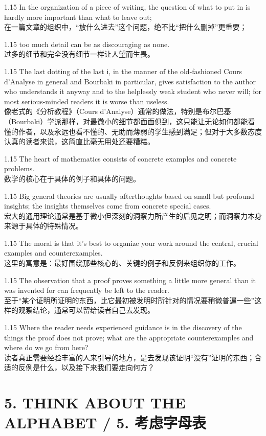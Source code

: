 \documentclass[12pt,a4paper]{article}
\newcommand{\bilingual}[2]{
    \begin{spacing}{1.15} %
        \noindent \normalsize #1 \\[-0.5ex] %
        \small \textcolor{blue!70!black}{#2} %
    \end{spacing}
    \vspace{0.8em} %
}
\begin{document}
\bilingual{In the organization of a piece of writing, the question of what to put in is hardly more important than what to leave out;}
{在一篇文章的组织中，“放什么进去”这个问题，绝不比“把什么删掉”更重要；} %

\bilingual{too much detail can be as discouraging as none.}
{过多的细节和完全没有细节一样让人望而生畏。} %

\bilingual{The last dotting of the last i, in the manner of the old-fashioned Cours d'Analyse in general and Bourbaki in particular, gives satisfaction to the author who understands it anyway and to the helplessly weak student who never will; for most serious-minded readers it is worse than useless.}
{像老式的《分析教程》（Cours d'Analyse）通常的做法，特别是布尔巴基（Bourbaki）学派那样，对最微小的细节都面面俱到，这只能让无论如何都能看懂的作者，以及永远也看不懂的、无助而薄弱的学生感到满足；但对于大多数态度认真的读者来说，这简直比毫无用处还要糟糕。} %

\bilingual{The heart of mathematics consists of concrete examples and concrete problems.}
{数学的核心在于具体的例子和具体的问题。} %

\bilingual{Big general theories are usually afterthoughts based on small but profound insights; the insights themselves come from concrete special cases.}
{宏大的通用理论通常是基于微小但深刻的洞察力所产生的后见之明；而洞察力本身来源于具体的特殊情况。} %

\bilingual{The moral is that it's best to organize your work around the central, crucial examples and counterexamples.}
{这里的寓意是：最好围绕那些核心的、关键的例子和反例来组织你的工作。} %

\bilingual{The observation that a proof proves something a little more general than it was invented for can frequently be left to the reader.}
{至于“某个证明所证明的东西，比它最初被发明时所针对的情况要稍微普遍一些”这样的观察结论，通常可以留给读者自己去发现。} %

\bilingual{Where the reader needs experienced guidance is in the discovery of the things the proof does not prove; what are the appropriate counterexamples and where do we go from here?}
{读者真正需要经验丰富的人来引导的地方，是去发现该证明“没有”证明的东西；合适的反例是什么，以及接下来我们要走向何方？} %

\section*{5. THINK ABOUT THE ALPHABET / 5. 考虑字母表} %
\end{document}
